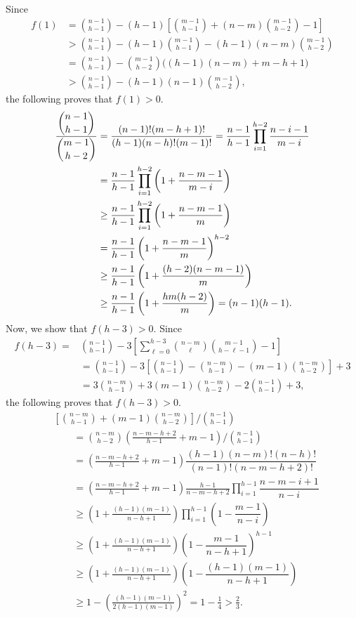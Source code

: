 \documentclass[12pt,oneside]{amsart}
\begin{document}
Since 
\begin{align*}
 f(1) &= \binom{n-1}{h-1} - (h-1)\left[\binom{m-1}{h-1} + (n-m)\binom{m-1}{h-2} - 1\right]\\
    &>  \binom{n-1}{h-1} - (h-1)\binom{m-1}{h-1} - (h-1)(n-m)\binom{m-1}{h-2} \\
    &= \binom{n-1}{h-1} - \binom{m-1}{h-2}\Big((h-1)(n-m)+m-h+1\Big)\\
    &> \binom{n-1}{h-1} - (h-1)(n-1)\binom{m-1}{h-2},
\end{align*}
the following proves that $f(1)> 0$. 
\begin{align*}
    \dfrac{\dbinom{n-1}{h-1}}{\dbinom{m-1}{h-2}}&= \frac{(n-1)!(m-h+1)!}{(h-1) (n-h)!(m-1)!} 
    = \frac{n-1}{h-1}\prod_{i=1}^{h-2}\frac{n-i-1}{m-i}\\
    &= \frac{n-1}{h-1}\prod_{i=1}^{h-2}\left(1 + \frac{n-m-1}{m-i}\right)\\
   & \geq \frac{n-1}{h-1}\prod_{i=1}^{h-2}\left(1 + \frac{n-m-1}{m}\right)\\
    &= \frac{n-1}{h-1}\left(1 + \frac{n-m-1}{m}\right)^{h-2}\\
   & \geq \frac{n-1}{h-1}\left(1 + \frac{(h-2)(n-m-1)}{m}\right) \\
   & \geq \frac{n-1}{h-1}\left(1 + \frac{hm(h-2)}{m}\right)=(n-1)(h-1).
\end{align*}
Now, we show that $f(h-3)>0$. 
Since 
\begin{align*}
    f(h-3) =& \binom{n-1}{h-1} - 3\left[\sum_{\ell=0}^{h-3}\binom{n-m}{\ell}\binom{m-1}{h-\ell-1} - 1\right]\\
    &= \binom{n-1}{h-1} - 3\left[ \binom{n-1}{h-1} -  \binom{n-m}{h-1} - (m-1)\binom{n-m}{h-2}\right]+3\\
    &= 3\binom{n-m}{h-1} + 3(m-1)\binom{n-m}{h-2} - 2\binom{n-1}{h-1} + 3,
\end{align*}
the following proves that $f(h-3)> 0$. 
\begin{align*}
    &\left[\binom{n-m}{h-1}+(m-1)\binom{n-m}{h-2}\right]\bigg/\binom{n-1}{h-1} \\
    &\qquad= \binom{n-m}{h-2}\left(\frac{n-m-h+2}{h-1} + m - 1\right)\bigg/\binom{n-1}{h-1}\\
    &\qquad= \left(\frac{n-m-h+2}{h-1} + m - 1\right)\dfrac{(h-1)(n-m)!(n-h)!}{(n-1)!(n-m-h+2)!}\\
    &\qquad= \left(\frac{n-m-h+2}{h-1} + m - 1\right)\frac{h-1}{n-m-h+2}\prod_{i=1}^{h-1}\dfrac{n-m-i+1}{n-i}\\
    &\qquad\geq \left(1 + \frac{(h-1)(m-1)}{n-h+1}\right) \prod_{i=1}^{h-1}\left(1-\dfrac{m-1}{n-i}\right)\\
    &\qquad\geq \left(1 + \frac{(h-1)(m-1)}{n-h+1}\right) \left(1 - \dfrac{m-1}{n-h+1}\right)^{h-1}\\
   &\qquad\geq \left(1 + \frac{(h-1)(m-1)}{n-h+1}\right) \left(1 - \dfrac{(h-1)(m-1)}{n-h+1}\right)\\
   &\qquad\geq 1 - \left(\frac{(h-1)(m-1)}{2(h-1)(m-1)}\right)^2
   = 1 - \frac{1}{4}  > \frac{2}{3}.
\end{align*}
\end{document}
